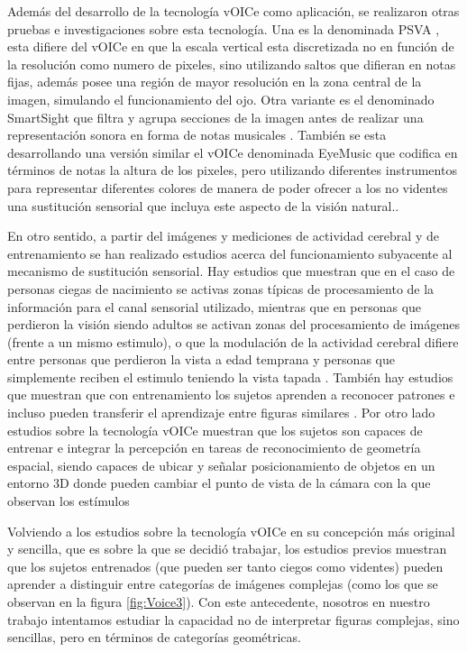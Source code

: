 \documentclass{article}
\begin{document}
    Además del desarrollo de la tecnología vOICe como aplicación, se realizaron otras pruebas e investigaciones sobre esta tecnología. Una es la denominada PSVA \cite{VoiceVariante1}, esta difiere del vOICe en que la escala vertical esta discretizada no en función de la resolución como numero de pixeles, sino utilizando saltos que difieran en notas fijas, además posee una región de mayor resolución en la zona central de la imagen, simulando el funcionamiento del ojo. Otra variante es el denominado SmartSight que filtra y agrupa secciones de la imagen antes de realizar una representación sonora en forma de notas musicales \cite{VoiceVariantes2, VoiceVariantes3}. También se esta desarrollando una versión similar el vOICe denominada EyeMusic que codifica en términos de notas la altura de los pixeles, pero utilizando diferentes instrumentos para representar diferentes colores de manera de poder ofrecer a los no videntes una sustitución sensorial que incluya este aspecto de la visión natural.\cite{VoiceVariantes4}.
    
    En otro sentido, a partir del imágenes y mediciones de actividad cerebral y de entrenamiento se han realizado estudios acerca del funcionamiento subyacente al mecanismo de sustitución sensorial. Hay estudios que muestran que en el caso de personas ciegas de nacimiento se activas zonas típicas de procesamiento de la información para el canal sensorial utilizado, mientras que en personas que perdieron la visión siendo adultos se activan zonas del procesamiento de imágenes (frente a un mismo estimulo), o que la modulación de la actividad cerebral difiere entre personas que perdieron la vista a edad temprana y personas que simplemente reciben el estimulo teniendo la vista tapada \cite{VoiceSubyacente1,VoiceSubyacente3}. También hay estudios que muestran que con entrenamiento los sujetos aprenden a reconocer patrones e incluso pueden transferir el aprendizaje entre figuras similares \cite{VoiceSubyacente2}. Por otro lado estudios sobre la tecnología vOICe muestran que los sujetos son capaces de entrenar e integrar la percepción en tareas de reconocimiento de geometría espacial, siendo capaces de ubicar y señalar posicionamiento de objetos en un entorno 3D donde pueden cambiar el punto de vista de la cámara con la que observan los estímulos \cite{VoiceSubyacente4}
    
    Volviendo a los estudios sobre la tecnología vOICe en su concepción más original y sencilla, que es sobre la que se decidió trabajar, los estudios previos muestran que los sujetos entrenados (que pueden ser tanto ciegos como videntes\cite{VoiceEntrenamiento1}) pueden aprender a distinguir entre categorías de imágenes complejas \cite{VoiceEntrenamiento2} (como los que se observan en la figura \ref{fig:Voice3}). Con este antecedente, nosotros en nuestro trabajo intentamos estudiar la capacidad no de interpretar figuras complejas, sino sencillas, pero en términos de categorías geométricas. 
    
\end{document}
